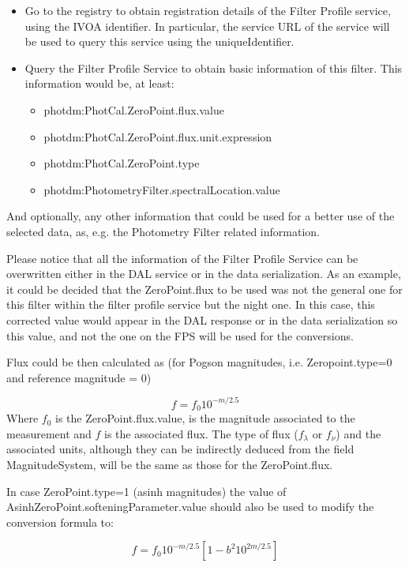 \documentclass[11pt,a4paper]{ivoa}
\begin{document}
\begin{itemize}
	\item Go to the registry to obtain registration details of the Filter Profile service, using the IVOA identifier. In particular, the service URL of the service will be used to query this service using the uniqueIdentifier.\par

	\item Query the Filter Profile Service to obtain basic information of this filter. This information would be, at least:\par

\begin{itemize}
	\item photdm:PhotCal.ZeroPoint.flux.value\par

	\item photdm:PhotCal.ZeroPoint.flux.unit.expression\par

	\item photdm:PhotCal.ZeroPoint.type\par

	\item photdm:PhotometryFilter.spectralLocation.value
\end{itemize}
\end{itemize}\par

And optionally, any other information that could be used for a better use of the selected data, as, e.g. the Photometry Filter related information.
\par

Please notice that all the information of the Filter Profile Service can be overwritten either in the DAL service or in the data serialization. As an example, it could be decided that the ZeroPoint.flux to be used was not the general one for this filter within the filter profile service but the night one. In this case, this corrected value would appear in the DAL response or in the data serialization so this value, and not the one on the FPS will be used for the conversions.
\par

Flux could be then calculated as (for Pogson magnitudes, i.e. Zeropoint.type=0 and reference magnitude = 0)
\par
\[
f = f_0 10^{-m/2.5}
\]
Where $f_0$ is the ZeroPoint.flux.value, is the magnitude associated to the measurement and $f$ is the associated flux. The type of flux ($f_\lambda $ or $f_\nu $) and the associated units, although they can be indirectly deduced from the field MagnitudeSystem, will be the same as those for the ZeroPoint.flux.
\par
In case ZeroPoint.type=1 (asinh magnitudes) the value of AsinhZeroPoint.softeningParameter.value should also be used to modify the conversion formula to:
\par
\[
f = f_0 10^{-m/2.5}\left[ 1 - b^2 10^{2m/2.5}\right]
\]
\end{document}
